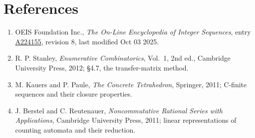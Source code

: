 \documentclass[11pt]{article}
\theoremstyle{definition}
\begin{document}
\section{References}

\begin{enumerate}

\item OEIS Foundation Inc., \emph{The On-Line Encyclopedia of Integer Sequences}, entry \href{https://oeis.org/A224155}{A224155}, revision 8, last modified Oct 03 2025.

\item R. P. Stanley, \emph{Enumerative Combinatorics}, Vol.~1, 2nd ed., Cambridge University Press, 2012; \S4.7, the transfer-matrix method.

\item M. Kauers and P. Paule, \emph{The Concrete Tetrahedron}, Springer, 2011; C-finite sequences and their closure properties.

\item J. Berstel and C. Reutenauer, \emph{Noncommutative Rational Series with Applications}, Cambridge University Press, 2011; linear representations of counting automata and their reduction.

\end{enumerate}
\end{document}
